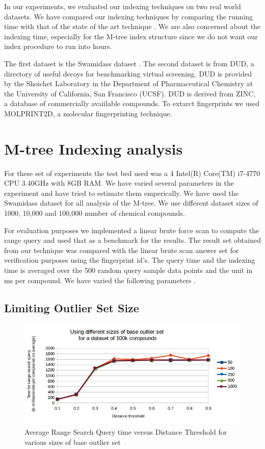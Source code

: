 
In our experiments, we evaluated our indexing techniques on two real world datasets. We have compared our indexing techniques by comparing the running time with that of the state of the art technique . We are also concerned about the indexing time, especially for the M-tree index structure since we do not want our index procedure to run into hours.

The first dataset is the Swamidass dataset . The second dataset is from DUD, a directory of useful decoys for benchmarking virtual screening. DUD is provided by the Shoichet Laboratory in the Department of Pharmaceutical Chemistry at the University of California, San Francisco (UCSF). DUD is derived from ZINC, a database of commercially avaiilable compounds. To extarct fingerprints we used MOLPRINT2D, a molecular fingerprinting technique.


\section{M-tree Indexing analysis}	

For these set of experiments the test bed used was a 4 Intel(R) Core(TM) i7-4770 CPU \@ 3.40GHz with 8GB RAM. We have varied several parameters in the experiment and have tried to estimate them emperically. We have used the Swamidass dataset for all analysis of the M-tree. We use different dataset sizes of 1000, 10,000 and 100,000 number of chemical compounds.

For evaluation purposes we implemented a linear brute force scan to compute the range query and used that as a benchmark for the results. The result set obtained from our technique was compared with the linear brute scan answer set for verification purposes using the fingerprint id's. The query time and the indexing time is averaged over the 500 random query sample data points and the unit in ms per compound. We have varied the following parameters .


\subsection{Limiting Outlier Set Size }

\begin{figure}[ht]	
\centering
\includegraphics[width=1 \columnwidth]{img/image1.jpg}
\caption{Average Range Search Query time versus Distance Threshold for various sizes of base outlier set}
\label{fig:5.1}
\end{figure}

